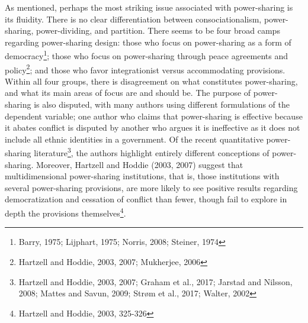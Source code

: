 \documentclass[12pt]{article}
\begin{document}
As mentioned, perhaps the most striking issue associated with power-sharing is its fluidity. There is no clear differentiation between consociationalism, power-sharing, power-dividing, and partition. There seems to be four broad camps regarding power-sharing design: those who focus on power-sharing as a form of democracy\footnote{Barry, 1975; Lijphart, 1975; Norris, 2008; Steiner, 1974}; those who focus on power-sharing through peace agreements and policy\footnote{Hartzell and Hoddie, 2003, 2007; Mukherjee, 2006}; and those who favor integrationist versus accommodating provisions. Within all four groups, there is disagreement on what constitutes power-sharing, and what its main areas of focus are and should be. The purpose of power-sharing is also disputed, with many authors using different formulations of the dependent variable; one author who claims that power-sharing is effective because it abates conflict is disputed by another who argues it is ineffective as it does not include all ethnic identities in a government. Of the recent quantitative power-sharing literature\footnote{Hartzell and Hoddie, 2003, 2007; Graham et al., 2017; Jarstad and Nilsson, 2008; Mattes and Savun, 2009; Strøm et al., 2017; Walter, 2002}, the authors highlight entirely different conceptions of power-sharing. Moreover, Hartzell and Hoddie (2003, 2007) suggest that multidimensional power-sharing institutions, that is, those institutions with several power-sharing provisions, are more likely to see positive results regarding democratization and cessation of conflict than fewer, though fail to explore in depth the provisions themselves\footnote{Hartzell and Hoddie, 2003, 325-326}. 
\end{document}
